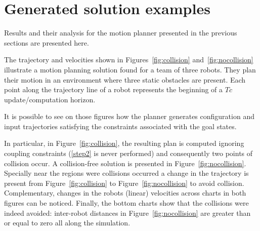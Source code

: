 \section{Generated solution examples}

Results and their analysis for the motion planner presented in the previous sections are 
presented here.

The trajectory and velocities shown in Figures~\ref{fig:collision} and~\ref{fig:nocollision}
illustrate a motion planning solution found for a team of three robots.
They plan their motion in an environment where three static obstacles are present.
Each point along the trajectory line of a robot represents the beginning
of a $Tc$ update/computation horizon.

It is possible to see on those figures how the planner generates configuration and 
input trajectories satisfying the constraints associated with the goal states.

In particular, in Figure~\ref{fig:collision}, the resulting plan is computed ignoring 
coupling constraints (\ref{step2} is never performed) and consequently two points of collision occur.
A collision-free solution is presented in Figure~\ref{fig:nocollision}.
Specially near the regions were collisions occurred a change in the trajectory is present from Figure~\ref{fig:collision} to Figure~\ref{fig:nocollision} to avoid collision. 
Complementary, changes 
in the robots (linear) velocities across charts in both figures can be noticed. Finally, the 
bottom charts show that the collisions were indeed avoided: inter-robot distances in 
Figure~\ref{fig:nocollision} are greater than or equal to zero all along the 
simulation.


